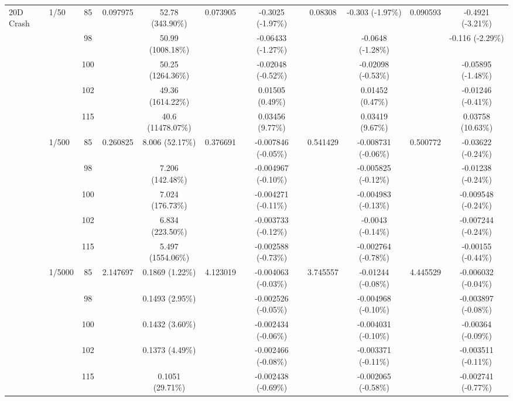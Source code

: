 \begin{table}[htbp]
{\begin{tabular}{llccccccccc}
\multirow{15}{*}{20D Crash}
& \multirow{5}{*}{1/50} & 85 & \multirow{5}{*}{0.097975} & 52.78 (343.90\%) & \multirow{5}{*}{0.073905} & -0.3025 (-1.97\%) & \multirow{5}{*}{0.08308} & -0.303 (-1.97\%) & \multirow{5}{*}{0.090593} & -0.4921 (-3.21\%) \\
& & 98 & & 50.99 (1008.18\%) & & -0.06433 (-1.27\%) & & -0.0648 (-1.28\%) & & -0.116 (-2.29\%) \\
& & 100 & & 50.25 (1264.36\%) & & -0.02048 (-0.52\%) & & -0.02098 (-0.53\%) & & -0.05895 (-1.48\%) \\
& & 102 & & 49.36 (1614.22\%) & & 0.01505 (0.49\%) & & 0.01452 (0.47\%) & & -0.01246 (-0.41\%) \\
& & 115 & & 40.6 (11478.07\%) & & 0.03456 (9.77\%) & & 0.03419 (9.67\%) & & 0.03758 (10.63\%) \\
\cmidrule(lr){2-11}
& \multirow{5}{*}{1/500} & 85 & \multirow{5}{*}{0.260825} & 8.006 (52.17\%) & \multirow{5}{*}{0.376691} & -0.007846 (-0.05\%) & \multirow{5}{*}{0.541429} & -0.008731 (-0.06\%) & \multirow{5}{*}{0.500772} & -0.03622 (-0.24\%) \\
& & 98 & & 7.206 (142.48\%) & & -0.004967 (-0.10\%) & & -0.005825 (-0.12\%) & & -0.01238 (-0.24\%) \\
& & 100 & & 7.024 (176.73\%) & & -0.004271 (-0.11\%) & & -0.004983 (-0.13\%) & & -0.009548 (-0.24\%) \\
& & 102 & & 6.834 (223.50\%) & & -0.003733 (-0.12\%) & & -0.0043 (-0.14\%) & & -0.007244 (-0.24\%) \\
& & 115 & & 5.497 (1554.06\%) & & -0.002588 (-0.73\%) & & -0.002764 (-0.78\%) & & -0.00155 (-0.44\%) \\
\cmidrule(lr){2-11}
& \multirow{5}{*}{1/5000} & 85 & \multirow{5}{*}{2.147697} & 0.1869 (1.22\%) & \multirow{5}{*}{4.123019} & -0.004063 (-0.03\%) & \multirow{5}{*}{3.745557} & -0.01244 (-0.08\%) & \multirow{5}{*}{4.445529} & -0.006032 (-0.04\%) \\
& & 98 & & 0.1493 (2.95\%) & & -0.002526 (-0.05\%) & & -0.004968 (-0.10\%) & & -0.003897 (-0.08\%) \\
& & 100 & & 0.1432 (3.60\%) & & -0.002434 (-0.06\%) & & -0.004031 (-0.10\%) & & -0.00364 (-0.09\%) \\
& & 102 & & 0.1373 (4.49\%) & & -0.002466 (-0.08\%) & & -0.003371 (-0.11\%) & & -0.003511 (-0.11\%) \\
& & 115 & & 0.1051 (29.71\%) & & -0.002438 (-0.69\%) & & -0.002065 (-0.58\%) & & -0.002741 (-0.77\%) \\
\midrule


\end{tabular}}
\end{table}
